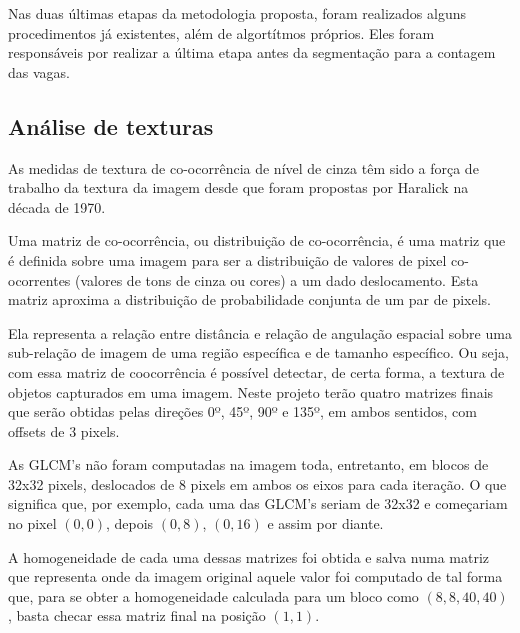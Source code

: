 \documentclass[10pt,twocolumn,letterpaper]{article}
\begin{document}
	Nas duas últimas etapas da metodologia proposta, foram realizados alguns procedimentos
já existentes, além de algortítmos próprios. Eles foram responsáveis por realizar a última etapa
antes da segmentação para a contagem das vagas.

\subsection{Análise de texturas}

	As medidas de textura de co-ocorrência de nível de cinza têm sido a força de trabalho
da textura da imagem desde que foram propostas por Haralick{\footnotesize \cite{haralick}}
na década de 1970.

	Uma matriz de co-ocorrência, ou distribuição de co-ocorrência,{\footnotesize \cite{GLCM-tutorial}}
é uma matriz que é definida sobre uma imagem para ser a distribuição de valores de pixel
co-ocorrentes (valores de tons de cinza ou cores) a um dado deslocamento. Esta matriz
aproxima a distribuição de probabilidade conjunta de um par de pixels.

	Ela representa a relação entre distância e relação de angulação espacial sobre uma
sub-relação de imagem de uma região específica e de tamanho específico. Ou seja, com
essa matriz de coocorrência é possível detectar, de certa forma, a textura de objetos
capturados em uma imagem. Neste projeto terão quatro matrizes finais que serão obtidas
pelas direções 0º, 45º, 90º e 135º, em ambos sentidos, com offsets de 3 pixels.

	As GLCM's não foram computadas na imagem toda, entretanto, em blocos de 32x32
pixels, deslocados de 8 pixels em ambos os eixos para cada iteração. O que significa que,
por exemplo, cada uma das GLCM's seriam de 32x32 e começariam no pixel $(0,0)$, depois
$(0,8)$, $(0,16)$ e assim por diante.

	A homogeneidade de cada uma dessas matrizes foi obtida
e salva numa matriz que representa onde da imagem original aquele valor foi computado
de tal forma que, para se obter a homogeneidade calculada para um bloco como $(8,8, 40,40)$, basta
checar essa matriz final na posição $(1,1)$.
\end{document}

